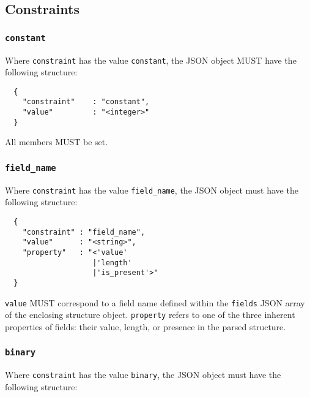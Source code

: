 \documentclass[10pt,twocolumn,a4paper]{article}
\begin{document}
\subsection{Constraints}
\label{sec:constraints}

\subsubsection{\texttt{constant}}

Where \texttt{constraint} has the value \texttt{constant}, the JSON object MUST have the
following structure:

\begin{verbatim}
  {
    "constraint"    : "constant",
    "value"         : "<integer>"
  }
\end{verbatim}

All members MUST be set.

\subsubsection{\texttt{field\_name}}

Where \texttt{constraint} has the value \texttt{field\_name}, the JSON object must have
the following structure:

\begin{verbatim}
  {
    "constraint" : "field_name",
    "value"      : "<string>",
    "property"   : "<'value'
                    |'length'
                    |'is_present'>"
  }
\end{verbatim}

\texttt{value} MUST correspond to a field name defined within the \texttt{fields} JSON
array of the enclosing structure object. \texttt{property} refers to one of the three
inherent properties of fields: their value, length, or presence in the parsed structure.

\subsubsection{\texttt{binary}}

Where \texttt{constraint} has the value \texttt{binary}, the JSON object must have
the following structure:
\end{document}
